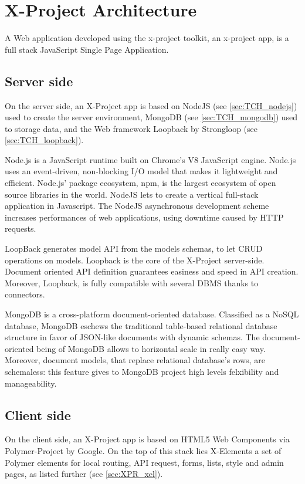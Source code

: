 \section{X-Project Architecture}
\label{sec:XPR_arc}

A Web application developed using the x-project toolkit, an x-project app, is a full stack JavaScript Single Page Application.

\subsection{Server side}
\label{subsec:XPR_arc_serv}

On the server side, an X-Project app is based on NodeJS (see \ref{sec:TCH_nodejs}) used to create the server environment, MongoDB (see \ref{sec:TCH_mongodb}) used to storage data, and the Web framework Loopback by Strongloop (see \ref{sec:TCH_loopback}).

Node.js is a JavaScript runtime built on Chrome's V8 JavaScript engine. Node.js uses an event-driven, non-blocking I/O model that makes it lightweight and efficient. Node.js' package ecosystem, npm, is the largest ecosystem of open source libraries in the world. 
NodeJS lets to create a vertical full-stack application in Javascript. The NodeJS asynchronous development scheme increases performances of web applications, using downtime caused by HTTP requests.

LoopBack generates model API from the models schemas, to let CRUD operations on models.
Loopback is the core of the X-Project server-side. Document oriented API definition guarantees easiness and speed in API creation. Moreover, Loopback, is fully compatible with several DBMS thanks to connectors. 

MongoDB is a cross-platform document-oriented database. Classified as a NoSQL database, MongoDB eschews the traditional table-based relational database structure in favor of JSON-like documents with dynamic schemas.
The document-oriented being of MongoDB allows to horizontal scale in really easy way. Moreover, document models, that replace relational database's rows, are schemaless: this feature gives to MongoDB project high levels felxibility and manageability.


\subsection{Client side}
\label{subsec:XPR_arc_clie}

On the client side, an X-Project app is based on HTML5 Web Components via Polymer-Project by Google.
On the top of this stack lies X-Elements a set of Polymer elements for local routing, API request, forms, lists, style and admin pages, as listed further (see \ref{sec:XPR_xel}).

